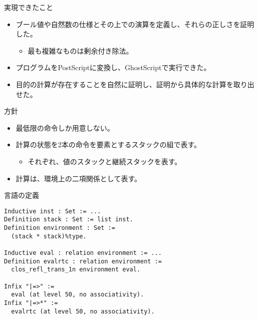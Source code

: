 \documentclass[cjk, 14pt]{beamer}
\begin{document}
\begin{frame}{実現できたこと}

  \begin{itemize}
    \item ブール値や自然数の仕様とその上での演算を定義し、それらの正しさを証明した。
    \begin{itemize}
      \item 最も複雑なものは剰余付き除法。
    \end{itemize}
    \item プログラムをPostScriptに変換し、GhostScriptで実行できた。
    \item 目的の計算が存在することを自然に証明し、証明から具体的な計算を取り出せた。
  \end{itemize}

\end{frame}

\begin{frame}{方針}

  \begin{itemize}
    \item 最低限の命令しか用意しない。
    \item 計算の状態を2本の命令を要素とするスタックの組で表す。
    \begin{itemize}
      \item それぞれ、値のスタックと継続スタックを表す。
    \end{itemize}
    \item 計算は、環境上の二項関係として表す。
  \end{itemize}

\end{frame}

\begin{frame}[fragile]{言語の定義}

\small
\begin{verbatim}
Inductive inst : Set := ...
Definition stack : Set := list inst.
Definition environment : Set :=
  (stack * stack)%type.

Inductive eval : relation environment := ...
Definition evalrtc : relation environment :=
  clos_refl_trans_1n environment eval.

Infix "|=>" :=
  eval (at level 50, no associativity).
Infix "|=>*" :=
  evalrtc (at level 50, no associativity).
\end{verbatim}

\end{frame}
\end{document}
